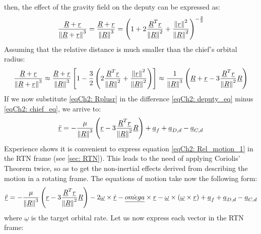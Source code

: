 	\noindent then, the effect of the gravity field on the deputy can be expressed as:
	\[
	\dfrac{\underline{R} + \underline{r}}{\mbox{$\left\lVert \underline{R} + \underline{r} \right\rVert$}^{3}} = \dfrac{\underline{R} + \underline{r}}{\mbox{$\left\lVert \underline{R} \right\rVert$}^{3}} = \left( 1 + 2 \dfrac{\underline{R}^T \underline{r}}{\mbox{$\left\lVert \underline{R} \right\rVert$}^2} + \dfrac{\mbox{$\left\lVert \underline{r} \right\rVert$}^2}{\mbox{$\left\lVert \underline{R} \right\rVert$}^2} \right)^{-\frac{3}{2}}
	\]
	\indent Assuming that the relative distance is much smaller than the chief's orbital radius:
	\begin{equation}
	\dfrac{\underline{R} + \underline{r}}{\mbox{$\left\lVert \underline{R} + \underline{r} \right\rVert$}^{3}} \approx \dfrac{\underline{R} + \underline{r}}{\mbox{$\left\lVert \underline{R} \right\rVert$}^{3}} \left[1 - \frac{3}{2} \left( 2 \dfrac{\underline{R}^T \underline{r}}{\mbox{$\left\lVert \underline{R} \right\rVert$}^2} + \dfrac{\mbox{$\left\lVert \underline{r} \right\rVert$}^2}{\mbox{$\left\lVert \underline{R} \right\rVert$}^2} \right) \right] \approx  \dfrac{1}{\mbox{$\left\lVert \underline{R} \right\rVert$}^{3}} \left(\underline{R} + \underline{r} - 3 \dfrac{\underline{R}^T \underline{r}}{\mbox{$\left\lVert \underline{R} \right\rVert$}^2} \underline{R} \right)
	\label{eqCh2: 	Rplusr}
	\end{equation}
	\indent If we now substitute \eqref{eqCh2: 	Rplusr} in the difference \eqref{eqCh2:	deputy_eq} minus \eqref{eqCh2:	chief_eq}, we arrive to:
	\begin{equation}
	\underline{\ddot{r}} = - \dfrac{\mu}{\mbox{$\left\lVert \underline{R} \right\rVert$}^3} \left(\underline{r} - 3 \dfrac{\underline{R}^T \underline{r}}{\mbox{$\left\lVert \underline{R} \right\rVert$}^2} \underline{R} \right) + \underline{a}_f + \underline{a}_{D, d} - \underline{a}_{C, d}
	\label{eqCh2: 	Rel_motion_1}
	\end{equation}
	\indent Experience shows it is convenient to express equation \eqref{eqCh2: 	Rel_motion_1} in the RTN frame (see \ref{sec: RTN}). This leads to the need of applying Coriolis' Theorem twice, so as to get the non-inertial effects derived from describing the motion in a rotating frame. The equations of motion take now the following form:
	\begin{equation}
	\underline{\ddot{r}} = - \dfrac{\mu}{\mbox{$\left\lVert \underline{R} \right\rVert$}^3} \left(\underline{r} - 3 \dfrac{\underline{R}^T \underline{r}}{\mbox{$\left\lVert \underline{R} \right\rVert$}^2} \underline{R} \right) - 2 \underline{\omega}\times  \underline{\dot{r}} - \underline{\dot{omega}}\times \underline{r} - \underline{\omega}\times \left( \underline{\omega} \times \underline{r}\right) + \underline{a}_f + \underline{a}_{D, d} - \underline{a}_{C, d}
	\label{eqCh2: 	Rel_motion_2}
	\end{equation}
	\noindent where $\underline{\omega}$ is the target orbital rate. Let us now express each vector in the RTN frame:
